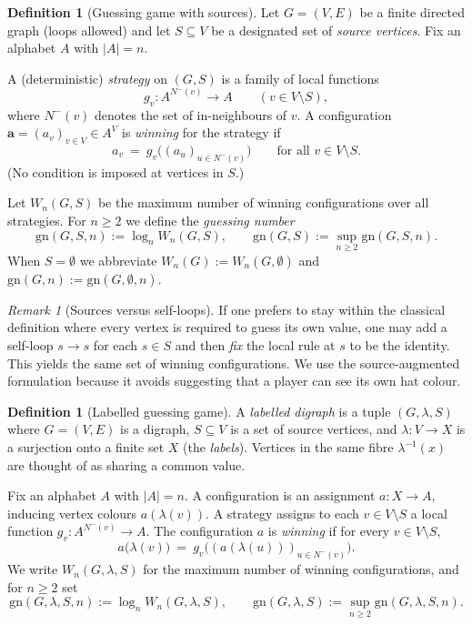 \documentclass[11pt]{article}
\theoremstyle{plain}
\theoremstyle{definition}
\theoremstyle{definition}
\newtheorem{definition}[theorem]{Definition}
\theoremstyle{remark}
\newtheorem{remark}[theorem]{Remark}
\newcommand{\A}{A}
\newcommand{\gn}{\mathrm{gn}}
\begin{document}
\begin{definition}[Guessing game with sources]
\label{def:guessing-game}
Let $G=(V,E)$ be a finite directed graph (loops allowed) and let $S\subseteq V$ be a designated set of
\emph{source vertices}. Fix an alphabet $\A$ with $|\A|=n$.

A (deterministic) \emph{strategy} on $(G,S)$ is a family of local functions
\[
  g_v:\A^{N^-(v)}\to \A \qquad (v\in V\setminus S),
\]
where $N^-(v)$ denotes the set of in-neighbours of $v$.
A configuration $\mathbf a=(a_v)_{v\in V}\in\A^V$ is \emph{winning} for the strategy if
\[
  a_v\ =\ g_v\bigl((a_u)_{u\in N^-(v)}\bigr)\qquad\text{for all }v\in V\setminus S.
\]
(No condition is imposed at vertices in $S$.)

Let $W_n(G,S)$ be the maximum number of winning configurations over all strategies.
For $n\ge 2$ we define the \emph{guessing number}
\[
  \gn(G,S,n):=\log_n W_n(G,S),
  \qquad
  \gn(G,S):=\sup_{n\ge 2}\gn(G,S,n).
\]
When $S=\emptyset$ we abbreviate $W_n(G):=W_n(G,\emptyset)$ and $\gn(G,n):=\gn(G,\emptyset,n)$.
\end{definition}

\begin{remark}[Sources versus self-loops]
If one prefers to stay within the classical definition where every vertex is required to guess its own value,
one may add a self-loop $s\to s$ for each $s\in S$ and then \emph{fix} the local rule at $s$ to be the identity.
This yields the same set of winning configurations.
We use the source-augmented formulation because it avoids suggesting that a player can see its own hat colour.
\end{remark}

\begin{definition}[Labelled guessing game]
\label{def:labelled-guessing-game}
A \emph{labelled digraph} is a tuple $(G,\lambda,S)$ where $G=(V,E)$ is a digraph, $S\subseteq V$ is a set of
source vertices, and $\lambda:V\to X$ is a surjection onto a finite set $X$ (the \emph{labels}).
Vertices in the same fibre $\lambda^{-1}(x)$ are thought of as sharing a common value.

Fix an alphabet $\A$ with $|\A|=n$.
A configuration is an assignment $a:X\to \A$, inducing vertex colours $a(\lambda(v))$.
A strategy assigns to each $v\in V\setminus S$ a local function $g_v:\A^{N^-(v)}\to\A$.
The configuration $a$ is \emph{winning} if for every $v\in V\setminus S$,
\[
  a\bigl(\lambda(v)\bigr)\ =\ g_v\bigl((a(\lambda(u)))_{u\in N^-(v)}\bigr).
\]
We write $W_n(G,\lambda,S)$ for the maximum number of winning configurations, and for $n\ge 2$ set
\[
  \gn(G,\lambda,S,n):=\log_n W_n(G,\lambda,S),
  \qquad
  \gn(G,\lambda,S):=\sup_{n\ge 2}\gn(G,\lambda,S,n).
\]
\end{definition}
\end{document}
